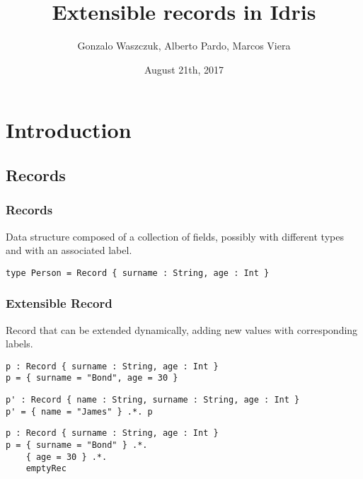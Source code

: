 \documentclass{beamer}
\title[Extensible records in Idris]{Extensible records in Idris}
\author{Gonzalo Waszczuk, Alberto Pardo, Marcos Viera}
\institute[UDELAR]
{
Instituto de Computación, Universidad de la República \\
Montevideo, Uruguay
\medskip
}
\date{August 21th, 2017}
\begin{document}
\begin{frame}
\titlepage
\end{frame}


\section{Introduction}

\subsection{Records}

\begin{frame}[fragile]
\frametitle{Records}

Data structure composed of a collection of fields, possibly with different types and with an associated label.

\pause

\begin{example}[Record]
\begin{verbatim}
type Person = Record { surname : String, age : Int }
\end{verbatim}
\end{example}

\end{frame}

\begin{frame}[fragile]
\frametitle{Extensible Record}

Record that can be extended dynamically, adding new values with corresponding labels.

\pause

\begin{example}
\begin{verbatim}
p : Record { surname : String, age : Int }
p = { surname = "Bond", age = 30 }
\end{verbatim}
\end{example}

\pause

\begin{example}
\begin{verbatim}
p' : Record { name : String, surname : String, age : Int }
p' = { name = "James" } .*. p
\end{verbatim}
\end{example}

\pause

\begin{example}
\begin{verbatim}
p : Record { surname : String, age : Int }
p = { surname = "Bond" } .*.
    { age = 30 } .*.
    emptyRec
\end{verbatim}
\end{example}

\end{frame}
\end{document}
